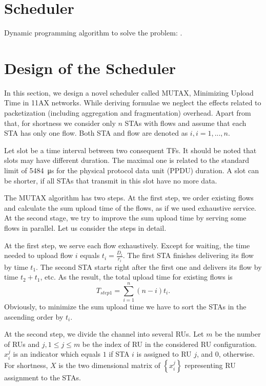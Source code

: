 
\section{Scheduler}
Dynamic programming algorithm to solve the problem: \cite{bourgeois1971extension}.

\section{Design of the Scheduler}
\label{mutex}
In this section, we design a novel scheduler called MUTAX, Minimizing Upload Time in 11AX networks. While deriving formulae we neglect the effects related to packetization (including aggregation and fragmentation) overhead. Apart from that, for shortness we consider only $n$ STAs with flows and assume that each STA has only one flow. Both STA and flow are denoted as $i, i=1,...,n$.

Let slot be a time interval between two consequent TFs.
It should be noted that slots may have different duration.
The maximal one is related to the standard limit of \SI{5484}{\us} for the physical protocol data unit (PPDU) duration.
A slot can be shorter, if all STAs that transmit in this slot have no more data.

The MUTAX algorithm has two steps. At the first step, we order existing flows and calculate the sum upload time of the flows, as if we used exhaustive service.
At the second stage, we try to improve the sum upload time by serving some flows in parallel.
Let us consider the steps in detail.
  
At the first step, we serve each flow exhaustively.
Except for waiting, the time needed to upload flow $i$ equals $t_i = \frac{D_i}{r_{i}}$. %
The first STA finishes delivering its flow by time $t_1$.
The second STA starts right after the first one and delivers its flow by time $t_2 + t_1$, etc.
As the result, the total upload time for existing flows is
\begin{equation}
T_{step1} = \sum_{i = 1}^{n} \left(n - i\right) t_i. 
\end{equation}
Obviously, to minimize the sum upload time we have to sort the STAs in the ascending order by $t_i$.

At the second step, we divide the channel into several RUs.   
Let $m$ be the number of RUs and $j, 1\le j \le m$ be the index of RU in the considered RU configuration.  
$x_i^j$ is an indicator which equals $1$ if STA $i$ is assigned to RU $j$, and $0$, otherwise.
For shortness, $X$ is the two dimensional matrix of $\left\{x_i^j\right\}$ representing RU assignment to the STAs. 

